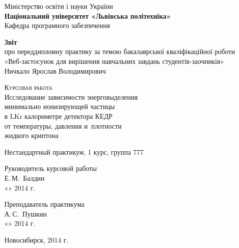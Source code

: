 \begin{titlepage}
  \begin{center}
    \large
    Міністерство освіти і науки України\\
    \textbf{Національний університет «Львівська політехніка»}\\
    Кафедра програмного забезпечення

    \vfill
      \textbf{Звіт}\\
      про переддипломну практику за темою бакалаврської кваліфікаційної роботи\\
      «Веб-застосунок для вирішення навчальних завдань студентів-заочників»\\
      Ничкало Ярослав Володимирович
    \vfill
 
    \textsc{Курсовая работа}\\[5mm]
     
    {\LARGE Исследование зависимости энерговыделения\\
      минимально ионизирующей частицы\\
    в LKr калориметре детектора КЕДР\\
    от температуры, давления и~плотности\\[2mm]
    жидкого криптона}
  \bigskip
     
    Нестандартный практикум, 1 курс, группа 777
\end{center}
\vfill
 
\newlength{\ML}
\hfill\begin{minipage}{0.4\textwidth}
  Руководитель курсовой работы\\
  \underline{\hspace{\ML}} Е.\,М.~Балдин\\
  «\underline{\hspace{0.7cm}}» \underline{\hspace{2cm}} 2014 г.
\end{minipage}%
\bigskip
 
\hfill\begin{minipage}{0.4\textwidth}
  Преподаватель практикума\\
  \underline{\hspace{\ML}} А.\,С.~Пушкин\\
  «\underline{\hspace{0.7cm}}» \underline{\hspace{2cm}} 2014 г.
\end{minipage}%
\vfill
 
\begin{center}
  Новосибирск, 2014 г.
\end{center}
\end{titlepage}